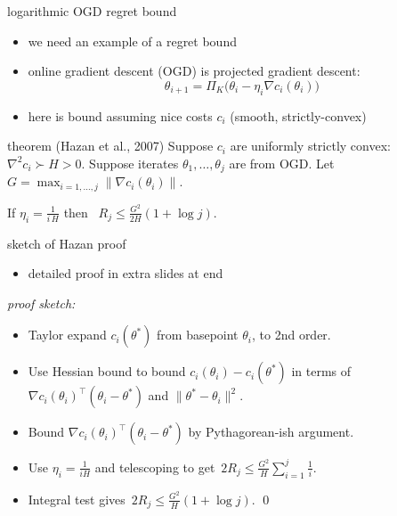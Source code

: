 \documentclass[xcolor={svgnames},
               hyperref={colorlinks,citecolor=DeepPink4,linkcolor=FireBrick,urlcolor=Maroon}]
               {beamer}
\newcommand{\grad}{\nabla}
\newcommand{\ds}{\displaystyle}
\begin{document}
\begin{frame}{logarithmic OGD regret bound}

\begin{itemize}
\item we need an example of a regret bound
\item online gradient descent (OGD) is projected gradient descent:
    $$\theta_{i+1} = \Pi_K \big(\theta_i - \eta_i \grad c_i(\theta_i)\big)$$
\item here is bound assuming nice costs $c_i$ (smooth, strictly-convex)
\end{itemize}

\begin{block}{theorem (Hazan et al., 2007)}
Suppose $c_i$ are uniformly strictly convex: $\grad^2 c_i \succ H > 0$.  Suppose iterates $\theta_1,\dots,\theta_j$ are from OGD.  Let $G = \max_{i=1,\dots,j} \|\grad c_i(\theta_i)\|$.

If $\ds \eta_i = \frac{1}{i\,H}$ then \, $\ds \boxed{R_j \le \frac{G^2}{2 H} (1 + \log j).}$
\end{block}
\end{frame}


\begin{frame}{sketch of Hazan proof}
\begin{itemize}
\item detailed proof in extra slides at end
\end{itemize}

\bigskip
\noindent \emph{proof sketch:}

\begin{itemize}
\item Taylor expand $c_i(\theta^*)$ from basepoint $\theta_i$, to 2nd order.
\item Use Hessian bound to bound $c_i(\theta_i) - c_i(\theta^*)$ in terms of $\grad c_i(\theta_i)^\top (\theta_i - \theta^*)$ and $\|\theta^* - \theta_i\|^2$.
\item Bound $\grad c_i(\theta_i)^\top (\theta_i - \theta^*)$ by Pythagorean-ish argument.
\item Use $\eta_i = \frac{1}{i H}$ and telescoping to get\, $\ds 2 R_j \le \frac{G^2}{H} \sum_{i=1}^j \frac{1}{i}$.
\item Integral test gives\, $\ds 2 R_j \le \frac{G^2}{H} (1 + \log j)$. \hfill \qed
\end{itemize}
\end{frame}
\end{document}
